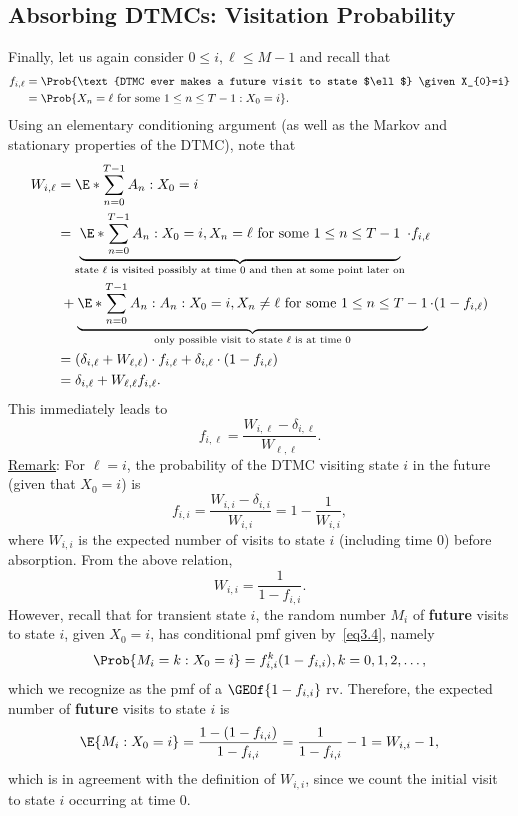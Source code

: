 \subsection*{Absorbing DTMCs: Visitation Probability}
\begin{Regular}
    Finally, let us again consider $0 \leq i, \ell \leq M-1$ and recall that
    \begin{align*}
        f_{i, \ell}
         & =\Prob{\text{DTMC ever makes a future visit to state $\ell$} \given X_{0}=i} \\
         & =\Prob{X_{n}=\ell \text{ for some } 1 \leq n \leq T-1 \given X_{0}=i}.
    \end{align*}
    Using an elementary conditioning argument (as well as the Markov and stationary properties of
    the DTMC), note that
    \begin{align*}
        W_{i,\ell}
         & =\E*{\sum_{n=0}^{T-1} A_n\given X_0=i}                                                                                                                                                           \\
         & =\underbrace{\E*{\sum_{n=0}^{T-1} A_n\given X_0=i,X_n=\ell\text{ for some }1\le n\le T-1}}_{\text{state $\ell$ is visited possibly at time $0$ and then at some point later on}}\cdot f_{i,\ell} \\
         & \;+\underbrace{\E*{\sum_{n=0}^{T-1} A_n\given A_n\given X_0=i,X_n\ne \ell\text{ for some }1\le n\le T-1}}_{\text{only possible visit to state $\ell$ is at time $0$}}\cdot(1-f_{i,\ell})         \\
         & =(\delta_{i,\ell}+W_{\ell,\ell})\cdot f_{i,\ell}+\delta_{i,\ell}\cdot(1-f_{i,\ell})                                                                                                              \\
         & =\delta_{i,\ell}+W_{\ell,\ell}f_{i,\ell}.
    \end{align*}
    This immediately leads to
    \[ f_{i,\ell}=\frac{W_{i,\ell}-\delta_{i,\ell}}{W_{\ell,\ell}}. \]
    \underline{Remark}: For $ \ell=i $, the probability of the DTMC visiting state $i$ in the future (given that $ X_0=i $) is
    \[ f_{i,i}=\frac{W_{i,i}-\delta_{i,i}}{W_{i,i}}=1-\frac{1}{W_{i,i}},   \]
    where $ W_{i,i} $ is the expected number of visits to state $i$ (including time $0$) before absorption. From the above relation,
    \[ W_{i,i}=\frac{1}{1-f_{i,i}}. \]
    However, recall that for transient state $i$, the random number $M_i$ of \textbf{future} visits to state $i$,
    given $ X_0=i $, has conditional pmf given by~\ref{eq3.4}, namely
    \[ \Prob{M_{i}=k \given X_{0}=i}=f_{i, i}^{k}(1-f_{i, i}), k=0,1,2, \ldots, \]
    which we recognize as the pmf of a $ \GEOf{1-f_{i,i}} $ rv. Therefore, the expected number of \textbf{future} visits to state $i$ is
    \[ \E{M_{i} \given X_{0}=i}=\frac{1-(1-f_{i, i})}{1-f_{i, i}}=\frac{1}{1-f_{i, i}}-1=W_{i, i}-1, \]
    which is in agreement with the definition of $ W_{i,i} $, since we count the initial visit to state $i$ occurring at time $0$.
\end{Regular}
